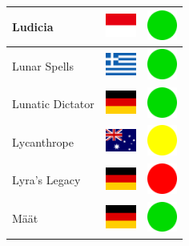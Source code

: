 \documentclass[12pt, a4paper, twoside]{report}
\begin{document}
\begin{center}
\begin{longtable}{|p{5cm}|p{2cm}|p{2cm}|}
 Ludicia                                                    & \includegraphics[width=1cm]{../img/flags/id} &   \includegraphics[width=1cm]{../likes/y} \\ \hline
 Lunar Spells                                               & \includegraphics[width=1cm]{../img/flags/gr} &   \includegraphics[width=1cm]{../likes/y} \\ \hline
 Lunatic Dictator                                           & \includegraphics[width=1cm]{../img/flags/de} &   \includegraphics[width=1cm]{../likes/y} \\ \hline
 Lycanthrope                                                & \includegraphics[width=1cm]{../img/flags/au} &   \includegraphics[width=1cm]{../likes/m} \\ \hline
 Lyra's Legacy                                              & \includegraphics[width=1cm]{../img/flags/de} &   \includegraphics[width=1cm]{../likes/n} \\ \hline
 Määt                                                       & \includegraphics[width=1cm]{../img/flags/de} &   \includegraphics[width=1cm]{../likes/y} \\ \hline

\end{longtable}
\end{center}
\end{document}
